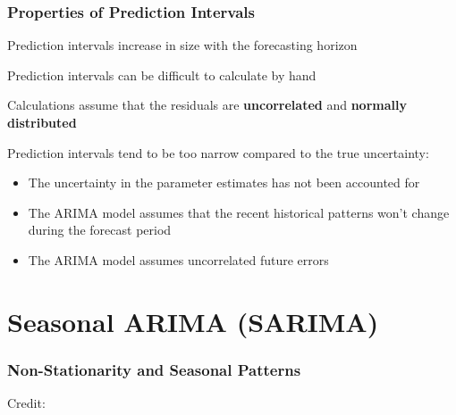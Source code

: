 \documentclass{beamer}
\newenvironment{wideenumerate}{\enumerate\addtolength{\itemsep}{10pt}}{\endenumerate}
\begin{document}
\begin{frame}
  \frametitle{Properties of Prediction Intervals}
  \begin{wideenumerate}
    \item Prediction intervals increase in size with the forecasting horizon
    \item Prediction intervals can be difficult to calculate by hand
    \item Calculations assume that the residuals are \textbf{uncorrelated} and \textbf{normally distributed}
    \item Prediction intervals tend to be too narrow compared to the true uncertainty:
      \begin{itemize}
      \item The uncertainty in the parameter estimates has not been accounted for
      \item The ARIMA model assumes that the recent historical patterns won't change during the forecast period
      \item The ARIMA model assumes uncorrelated future errors
      \end{itemize}
  \end{wideenumerate}
\end{frame}

\section{Seasonal ARIMA (SARIMA)}


\begin{frame}
  \frametitle{Non-Stationarity and Seasonal Patterns}
  \hspace*{15pt}\hbox{\scriptsize Credit:}
\end{frame}
\end{document}
